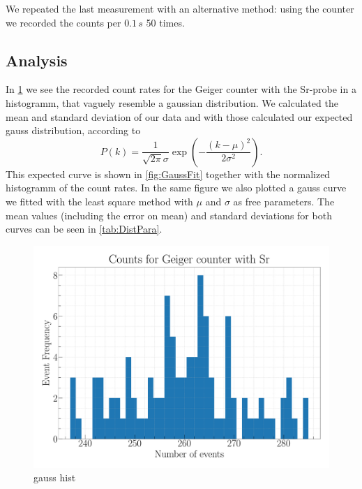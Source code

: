 We repeated the last measurement with an alternative method: using the counter we recorded the counts per $0.1\,s$ 50 times.

\subsection{Analysis}

In \cref{fig:GaussHist} we see the recorded count rates for the Geiger counter with the Sr-probe in a histogramm, that vaguely resemble a gaussian distribution. We calculated the mean and standard deviation of our data and with those calculated our expected gauss distribution, according to
\begin{equation}
P(k) = \frac{1}{\sqrt{2\pi}\sigma} \exp(-\frac{(k-\mu)^2}{2\sigma^2}).
\end{equation}
This expected curve is shown in \cref{fig:GaussFit} together with the normalized histogramm of the count rates. In the same figure we also plotted a gauss curve we fitted with the least square method with $\mu$ and $\sigma$ as free parameters. The mean values (including the error on mean) and standard deviations for both curves can be seen in \cref{tab:DistPara}.

\begin{figure}[H]
\centering
\includegraphics[width=\textwidth]{../Figures/Geiger_gauss_histogram.pdf}
\caption{gauss hist}
\label{fig:GaussHist}
\end{figure}


